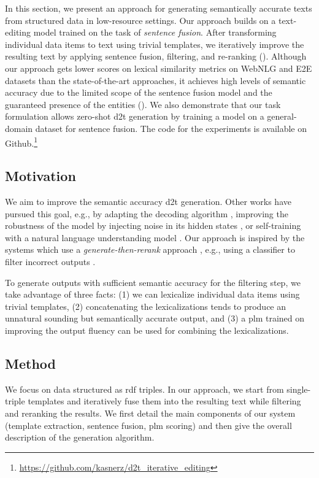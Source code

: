 In this section, we present an approach for generating semantically accurate texts from structured data in low-resource settings. Our approach builds on a text-editing model trained on the task of \emph{sentence fusion}. After transforming individual data items to text using trivial templates, we iteratively improve the resulting text by applying sentence fusion, filtering, and re-ranking ().  Although our approach gets lower scores on lexical similarity metrics on WebNLG and E2E datasets than the state-of-the-art approaches, it achieves high levels of semantic accuracy due to the limited scope of the sentence fusion model and the guaranteed presence of the entities (). We also demonstrate that our task formulation allows zero-shot \ac{d2t} generation by training a model on a general-domain dataset for sentence fusion. The code for the experiments is available on Github.\footnote{\url{https://github.com/kasnerz/d2t_iterative_editing}}


\subsection{Motivation}
\label{sec:iterative:motivation}
We aim to improve the semantic accuracy \ac{d2t} generation. Other works have pursued this goal, e.g., by adapting the decoding algorithm \cite{tianStickingFactsConfident2020}, improving the robustness of the model by injecting noise in its hidden states \cite{kedzie_good_2019}, or self-training with a natural language understanding model \cite{nieSimpleRecipeReducing2019}. Our approach is inspired by the systems which use a \emph{generate-then-rerank} approach \citep{dusekSequencetoSequenceGenerationSpoken2016,juraska_deep_2018}, e.g., using a classifier to filter incorrect outputs \cite{harkousHaveYourText2020}.

To generate outputs with sufficient semantic accuracy for the filtering step, we take advantage of three facts: (1) we can lexicalize individual data items using trivial templates, (2) concatenating the lexicalizations tends to produce an unnatural sounding but semantically accurate output, and (3) a \ac{plm} trained on improving the output fluency can be used for combining the lexicalizations.


\subsection{Method}
\label{sec:iterative:method}
We focus on data structured as \ac{rdf} triples. In our approach, we start from single-triple templates and iteratively fuse them into the resulting text while filtering and reranking the results. We first detail the main components of our system (template extraction, sentence fusion, \ac{plm} scoring) and then give the overall description of the generation algorithm.


